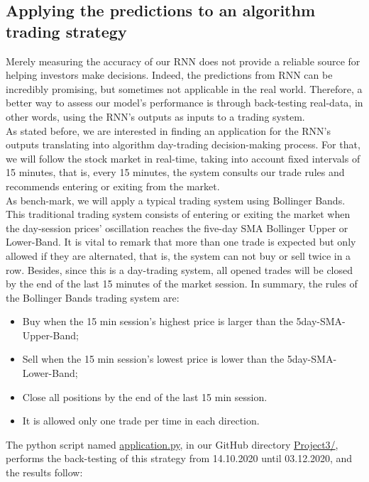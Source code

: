 \subsection{Applying the predictions to an algorithm trading strategy}
\label{chap:Applying the predictions to an algorithm trading strategy}

\quad Merely measuring the accuracy of our RNN does not provide a reliable source for helping investors make decisions. Indeed, the predictions from RNN can be incredibly promising, but sometimes not applicable in the real world. Therefore, a better way to assess our model's performance is through back-testing real-data, in other words, using the RNN's outputs as inputs to a trading system.\\

As stated before, we are interested in finding an application for the RNN's outputs translating into algorithm day-trading decision-making process. For that, we will follow the stock market in real-time, taking into account fixed intervals of 15 minutes, that is, every 15 minutes, the system consults our trade rules and recommends entering or exiting from the market.\\

As bench-mark, we will apply a typical trading system using Bollinger Bands. This traditional trading system consists of entering or exiting the market when the day-session prices' oscillation reaches the five-day SMA Bollinger Upper or Lower-Band. It is vital to remark that more than one trade is expected but only allowed if they are alternated, that is, the system can not buy or sell twice in a row. Besides, since this is a day-trading system, all opened trades will be closed by the end of the last 15 minutes of the market session. In summary, the rules of the Bollinger Bands trading system are:

\begin{itemize}
    \item Buy when the 15 min session's highest price is larger than the 5day-SMA-Upper-Band;
    \item Sell when the 15 min session's lowest price is lower than the 5day-SMA-Lower-Band;
    \item Close all positions by the end of the last 15 min session.
    \item It is allowed only one trade per time in each direction.
\end{itemize}

The python script named \href{https://github.com/fabiorodp/UiO-FYS-STK4155/tree/master/Project3/application.py}{application.py}, in our GitHub directory \href{https://github.com/fabiorodp/UiO-FYS-STK4155/tree/master/Project3/}{Project3/}, performs the back-testing of this strategy from 14.10.2020 until 03.12.2020, and the results follow:

